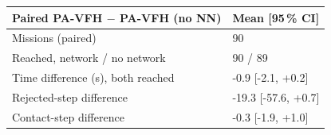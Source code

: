\footnotesize
\setlength{\tabcolsep}{3pt}
\begin{tabular}{ll}
\toprule
Paired PA-VFH $-$ PA-VFH (no NN) & Mean [95\,\% CI] \\
\midrule
Missions (paired) & 90 \\
Reached, network / no network & 90 / 89 \\
Time difference (s), both reached & -0.9 [-2.1, +0.2] \\
Rejected-step difference & -19.3 [-57.6, +0.7] \\
Contact-step difference & -0.3 [-1.9, +1.0] \\
\bottomrule
\end{tabular}
